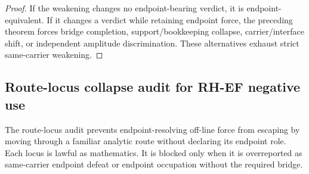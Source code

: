 \documentclass[11pt]{article}
\begin{document}
\begin{proof}
If the weakening changes no endpoint-bearing verdict, it is endpoint-equivalent.  If it changes a verdict while retaining endpoint force, the preceding theorem forces bridge completion, support/bookkeeping collapse, carrier/interface shift, or independent amplitude discrimination.  These alternatives exhaust strict same-carrier weakening.
\end{proof}

\subsection{Route-locus collapse audit for RH-EF negative use}

The route-locus audit prevents endpoint-resolving off-line force from escaping by moving through a familiar analytic route without declaring its endpoint role.  Each locus is lawful as mathematics.  It is blocked only when it is overreported as same-carrier endpoint defeat or endpoint occupation without the required bridge.
\end{document}
